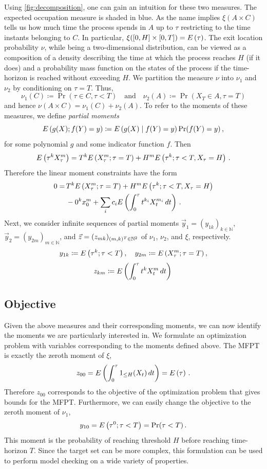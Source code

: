 Using \autoref{fig:decomposition}, one can gain an intuition for these two measures.
The expected occupation measure is shaded in blue.
As the name implies $\xi(A\times C)$ tells us how much time  the process spends
in $A$ up
to $\tau$ restricting to the time instants belonging to $C$.
In particular, $\xi([0,H]\times [0,T])={E}\left(\tau\right)$.
The exit location probability $\nu$, while being a two-dimensional distribution, can be viewed as a composition of a density describing the time at which the process reaches $H$ (if it does) and a probability mass function on the states of the process if the time-horizon is reached without exceeding $H$.
We partition the measure $\nu$ into $\nu_1$ and $\nu_2$ by conditioning on $\tau=T$.
Thus, $$\nu_1(C)\coloneqq\Pr(\tau\in C, \tau<T)\quad\text{and}\quad\nu_2(A)\coloneqq\Pr(X_T\in
A, \tau=T)$$
and hence $\nu(A\times C)=\nu_1(C)+\nu_2(A)$.
To refer to the moments of these measures, we define \emph{partial moments}
$$
    {E}\left(g({X}); f({Y}) = y\right)\coloneqq
    {E}\left(g({X})\mid f({Y})=y\right)\Pr(f({Y})=y)\,,
$$
for some polynomial $g$ and some indicator function $f$. Then
$${E}\left(\tau^k X_{\tau}^m\right)=T^k{E}\left(X_{\tau}^m;\tau=T\right) + H^m{E}\left({\tau}^k;\tau < T, X_{\tau}=H\right)\,.$$
Therefore the linear moment constraints have the form
\begin{equation}
    \begin{split}
        0 = \,&T^k{E}\left(X_{\tau}^m;\tau=T\right) + H^m{E}\left({\tau}^k;\tau < T, X_{\tau}=H\right)\\
        &- 0^kx_0^{m}
        + \sum_{i}c_i{E}\left(\int_{0}^{\tau} t^{k_i}X_t^{m_i}\,dt\right)\,.
    \end{split}
\end{equation}
Next, we consider infinite sequences of partial moments 
 $\vec{y}_1=(y_{1k})_{k\in\mathbb{N}}$, $\vec{y}_2=(y_{2m})_{m\in\mathbb{N}}$, and $\vec{z}=(z_{mk})_{(m,k)^{T}\in\mathbb{N}^2}$
 of $\nu_1$, $\nu_2$, and $\xi$, respectively.
$$y_{1k} \coloneqq {E}\left({\tau}^k;\tau < T\right),\quad y_{2m}\coloneqq{E}\left(X_{\tau}^m;\tau=T\right),$$
$$z_{km}\coloneqq{E}\left(\int_0^{\tau}t^k X_t^m\,dt\right)\,$$

\subsection{Objective}
Given the above measures and their corresponding moments, we can
now identify the moments we are particularly interested in.
We formulate an optimization problem with variables corresponding 
to the moments defined above.
The MFPT is exactly the zeroth moment of $\xi$,
$$z_{00}={E}\left(\int_0^{\tau}1_{\leq H}(X_t)\,dt\right) = {E}\left(\tau\right)\,.$$
Therefore $z_{00}$ corresponds to the objective of the optimization problem
that gives bounds for the MFPT.
Furthermore, we can easily change the objective to the  
zeroth moment of $\nu_1$,
$$y_{10} = {E}\left(\tau^0;\tau<T\right)=\Pr(\tau < T)\,.$$
This moment is the probability of reaching
threshold $H$ before reaching time-horizon $T$. Since the target set can be more complex, this formulation can be used to perform model checking on a
wide variety of properties.

